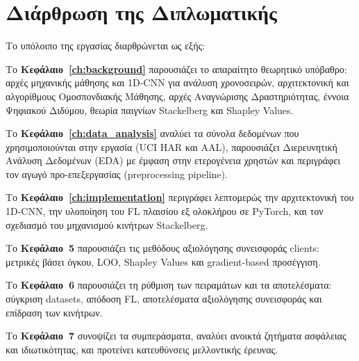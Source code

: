 
\section{Διάρθρωση της Διπλωματικής}
\label{sec:outline}

Το υπόλοιπο της εργασίας διαρθρώνεται ως εξής:

Το \textbf{Κεφάλαιο~\ref{ch:background}} παρουσιάζει το απαραίτητο
θεωρητικό υπόβαθρο: αρχές μηχανικής μάθησης και 1D-CNN για ανάλυση
χρονοσειρών, αρχιτεκτονική και αλγορίθμους Ομοσπονδιακής Μάθησης,
αρχές Αναγνώρισης Δραστηριότητας, έννοια Ψηφιακού Διδύμου, θεωρία
παιγνίων Stackelberg και Shapley Values.

Το \textbf{Κεφάλαιο~\ref{ch:data_analysis}} αναλύει τα σύνολα δεδομένων
που χρησιμοποιούνται στην εργασία (UCI HAR και AAL), παρουσιάζει
Διερευνητική Ανάλυση Δεδομένων (EDA) με έμφαση στην ετερογένεια χρηστών
και περιγράφει τον αγωγό προ-επεξεργασίας (preprocessing pipeline).

Το \textbf{Κεφάλαιο~\ref{ch:implementation}} περιγράφει λεπτομερώς την
αρχιτεκτονική του 1D-CNN, την υλοποίηση του FL πλαισίου εξ ολοκλήρου σε PyTorch,
και τον σχεδιασμό του μηχανισμού κινήτρων Stackelberg.

Το \textbf{Κεφάλαιο~5} παρουσιάζει τις μεθόδους
αξιολόγησης συνεισφοράς clients: μετρικές βάσει όγκου, LOO, Shapley
Values και gradient-based προσέγγιση.

Το \textbf{Κεφάλαιο~6} παρουσιάζει τη ρύθμιση των
πειραμάτων και τα αποτελέσματα: σύγκριση datasets, απόδοση FL,
αποτελέσματα αξιολόγησης συνεισφοράς και επίδραση των κινήτρων.

Το \textbf{Κεφάλαιο~7} συνοψίζει τα συμπεράσματα,
αναλύει ανοικτά ζητήματα ασφάλειας και ιδιωτικότητας, και προτείνει
κατευθύνσεις μελλοντικής έρευνας.
